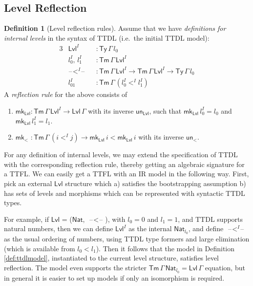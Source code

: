 \documentclass[a4paper,UKenglish,cleveref, autoref, thm-restate]{lipics-v2021}
\theoremstyle{remark}
\theoremstyle{definition}
\newtheorem{mydefinition}{Definition}
\newcommand{\Ty}{\mathsf{Ty}}
\newcommand{\Tm}{\mathsf{Tm}}
\newcommand{\blank}{\mathord{\hspace{1pt}\text{--}\hspace{1pt}}}
\newcommand{\Nat}{\mathsf{Nat}}
\newcommand{\Lvl}{\mathsf{Lvl}}
\newcommand{\msf}[1]{\mathsf{#1}}
\newcommand{\mkMor}{\msf{mk}\!_<}
\newcommand{\unMor}{\msf{un}\!_<}
\newcommand{\mkLvl}{\msf{mk}_{\Lvl}}
\newcommand{\unLvl}{\msf{un}_{\Lvl}}
\begin{document}
\subsection{Level Reflection}\label{sec:level_reflection}

\begin{mydefinition}[Level reflection rules]
Assume that we have \emph{definitions for internal levels} in the syntax of TTDL (i.e.\
the initial TTDL model):
\begin{alignat*}{3}
  &\Lvl^I               &&: \Ty\,\Gamma\,l_0\\
  &l_0^I,\,l_1^I         &&: \Tm\,\Gamma\,\Lvl^I \\
  &\blank\!<^I\!\blank  &&: \Tm\,\Gamma\,\Lvl^I \to \Tm\,\Gamma\,\Lvl^I \to \Ty\,\Gamma\,l_0\\
  &l_{01}^{I}            &&: \Tm\,\Gamma\,(l_0^I <^I l_1^I)
\end{alignat*}
A \emph{reflection rule} for the above consists of
\begin{enumerate}
  \item $\mkLvl : \Tm\,\Gamma\,\Lvl^I \to \Lvl\,\Gamma$ with its inverse $\unLvl$, such that $\mkLvl\,l_0^I = l_0$ and $\mkLvl\,l_1^I = l_1$.
  \item $\mkMor\,\,: \Tm\,\Gamma\,(i <^I j) \to \mkLvl\,i < \mkLvl\,i$ with its inverse
        $\unMor$.
\end{enumerate}
\end{mydefinition}

For any definition of internal levels, we may extend the specification of TTDL
with the corresponding reflection rule, thereby getting an algebraic signature
for a TTFL. We can easily get a TTFL with an IR model in the following
way. First, pick an external $\Lvl$ structure which a) satisfies the
bootstrapping assumption b) has sets of levels and morphisms which can be
represented with syntactic TTDL types.

For example, if $\Lvl$ = ($\Nat$, $\blank\!<\!\blank$), with $l_0 = 0$ and $l_1
= 1$, and TTDL supports natural numbers, then we can define $\Lvl^I$ as the
internal $\Nat_{l_0}$, and define $\blank\!<^I\!\blank$ as the usual ordering of
numbers, using TTDL type formers and large elimination (which is available from
$l_0 < l_1$). Then it follows that the model in Definition \ref{def:ttdlmodel},
instantiated to the current level structure, satisfies level reflection. The
model even supports the stricter $\Tm\,\Gamma\,\Nat_{l_0} = \Lvl\,\Gamma$
equation, but in general it is easier to set up models if only an isomorphism
is required.
\end{document}
